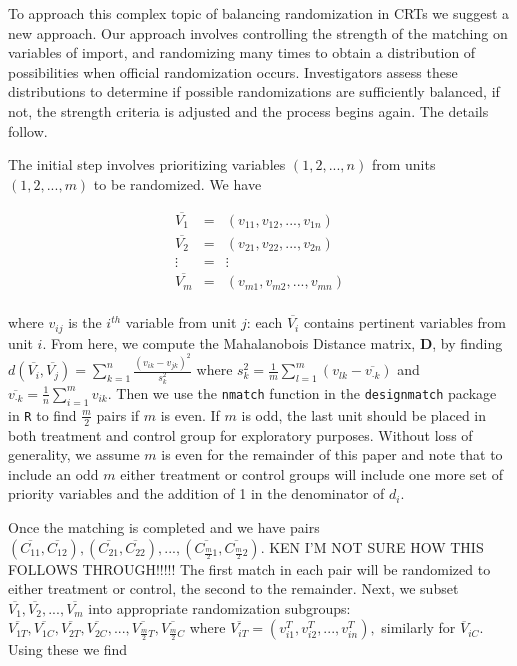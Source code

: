 \documentclass[]{sagej}
\begin{document}
To approach this complex topic of balancing randomization in CRTs we
suggest a new approach. Our approach involves controlling the strength
of the matching on variables of import, and randomizing many times to
obtain a distribution of possibilities when official randomization
occurs. Investigators assess these distributions to determine if
possible randomizations are sufficiently balanced, if not, the strength
criteria is adjusted and the process begins again. The details follow.

The initial step involves prioritizing variables \((1, 2,..., n)\) from
units \((1, 2, ..., m)\) to be randomized. We have

\begin{eqnarray*}
 \overline{V_1} & = & (v_{11}, v_{12},..., v_{1n})\\
 \overline{V_2} & = & (v_{21}, v_{22},..., v_{2n})\\
 \vdots & = & \vdots\\    
 \overline{V_m} & = & (v_{m1}, v_{m2},..., v_{mn})\\
\end{eqnarray*}

where \(v_{ij}\) is the \(i^{th}\) variable from unit \(j\): each
\(\overline{V_i}\) contains pertinent variables from unit \(i\). From
here, we compute the Mahalanobois Distance matrix, \textbf{D}, by
finding
\(d(\overline{V_i}, \overline{V_j}) = \sum_{k=1}^n \frac{(v_{ik} - v_{jk})^2}{s_k^2}\)
where
\(s_k^2 = \frac{1}{m} \sum_{l=1}^m(v_{lk} - \overline{v_{\cdot k}})\)
and \(\overline{v_{\cdot k}} = \frac{1}{n} \sum_{i = 1}^m v_{ik}\). Then
we use the \texttt{nmatch} function in the \texttt{designmatch}
\citep{doi} package in \texttt{R} \citep{nmatch} to find \(\frac{m}{2}\)
pairs if \(m\) is even. If \(m\) is odd, the last unit should be placed
in both treatment and control group for exploratory purposes. Without
loss of generality, we assume \(m\) is even for the remainder of this
paper and note that to include an odd \(m\) either treatment or control
groups will include one more set of priority variables and the addition
of 1 in the denominator of \(d_i\).

Once the matching is completed and we have pairs
\((\overline{C_{11}}, \overline{C_{12}}), (\overline{C_{21}}, \overline{C_{22}}), ..., (\overline{C_{\frac{m}{2}1}}, \overline{C_{\frac{m}{2}2}}).\)
KEN I'M NOT SURE HOW THIS FOLLOWS THROUGH!!!!! The first match in each
pair will be randomized to either treatment or control, the second to
the remainder. Next, we subset
\(\overline{V_1}, \overline{V_2}, ..., \overline{V_m}\) into appropriate
randomization subgroups:
\(\overline{V_{1T}}, \overline{V_{1C}}, \overline{V_{2T}}, \overline{V_{2C}},..., \overline{V_{\frac{m}{2}T}}, \overline{V_{\frac{m}{2}C}}\)
where \(\overline{V_{iT}} = (v_{i1}^T, v_{i2}^T,..., v_{in}^T),\)
similarly for \(\overline{V}_{iC}.\) Using these we find
\end{document}
